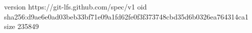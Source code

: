 version https://git-lfs.github.com/spec/v1
oid sha256:d9ae6e0ad03beb33bf71e09a1fd62fe0f3f373748cbd35d6b0326ea764314ca1
size 235849
